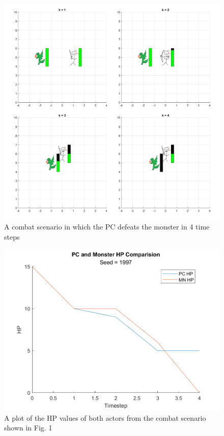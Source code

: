 \documentclass[letterpaper, 10 pt, conference]{ieeeconf}
\begin{document}
\begin{figure}[h]
\centering
\includegraphics[scale = 0.2]{figs/DND_SingleSim_Animation_rng_seed=1997.png}
\caption{A combat scenario in which the PC defeats the monster in 4 time steps}
\label{fig:single_sim_animation_1997}
\end{figure}

\begin{figure}[h]
    \centering
    \includegraphics[scale = 0.5]{figs/DND_SingleSim_HPcomp_rng_seed=1997.png}
    \caption{A plot of the HP values of both actors from the combat scenario shown in Fig. 1}
    \label{fig:single_sim_hpcomp_1997}
\end{figure}
\end{document}
